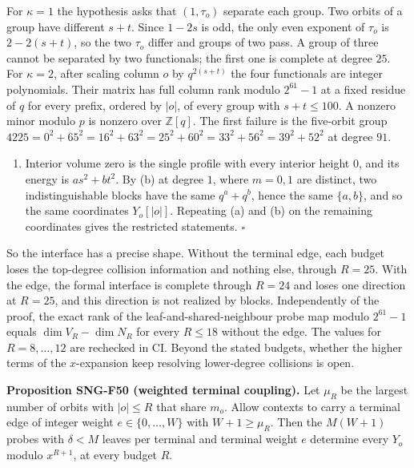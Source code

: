 \documentclass[
  11pt,
  a4paper,
]{report}
\providecommand{\tightlist}{%
  \setlength{\itemsep}{0pt}\setlength{\parskip}{0pt}}
\begin{document}
For \(\kappa=1\) the hypothesis asks that \((1,\tau_o)\) separate each
group. Two orbits of a group have different \(s+t\). Since \(1-2s\) is
odd, the only even exponent of \(\tau_o\) is \(2-2(s+t)\), so the two
\(\tau_o\) differ and groups of two pass. A group of three cannot be
separated by two functionals; the first one is complete at degree
\(25\). For \(\kappa=2\), after scaling column \(o\) by \(q^{2(s+t)}\)
the four functionals are integer polynomials. Their matrix has full
column rank modulo \(2^{61}-1\) at a fixed residue of \(q\) for every
prefix, ordered by \(|o|\), of every group with \(s+t\le100\). A nonzero
minor modulo \(p\) is nonzero over \(\mathbb Z[q]\). The first failure
is the five-orbit group
\(4225=0^2+65^2=16^2+63^2=25^2+60^2=33^2+56^2=39^2+52^2\) at degree
\(91\).

\begin{enumerate}
\def\labelenumi{(\alph{enumi})}
\setcounter{enumi}{2}
\tightlist
\item
  Interior volume zero is the single profile with every interior height
  \(0\), and its energy is \(as^2+bt^2\). By (b) at degree \(1\), where
  \(m=0,1\) are distinct, two indistinguishable blocks have the same
  \(q^a+q^b\), hence the same \(\{a,b\}\), and so the same coordinates
  \(Y_o[|o|]\). Repeating (a) and (b) on the remaining coordinates gives
  the restricted statements. \(\square\)
\end{enumerate}

So the interface has a precise shape. Without the terminal edge, each
budget loses the top-degree collision information and nothing else,
through \(R=25\). With the edge, the formal interface is complete
through \(R=24\) and loses one direction at \(R=25\), and this direction
is not realized by blocks. Independently of the proof, the exact rank of
the leaf-and-shared-neighbour probe map modulo \(2^{61}-1\) equals
\(\dim V_R-\dim N_R\) for every \(R\le18\) without the edge. The values
for \(R=8,\ldots,12\) are rechecked in CI. Beyond the stated budgets,
whether the higher terms of the \(x\)-expansion keep resolving
lower-degree collisions is open.

\textbf{Proposition SNG-F50 (weighted terminal coupling).} Let \(\mu_R\)
be the largest number of orbits with \(|o|\le R\) that share \(m_o\).
Allow contexts to carry a terminal edge of integer weight
\(e\in\{0,\ldots,W\}\) with \(W+1\ge\mu_R\). Then the \(M(W+1)\) probes
with \(\delta<M\) leaves per terminal and terminal weight \(e\)
determine every \(Y_o\) modulo \(x^{R+1}\), at every budget \(R\).
\end{document}
